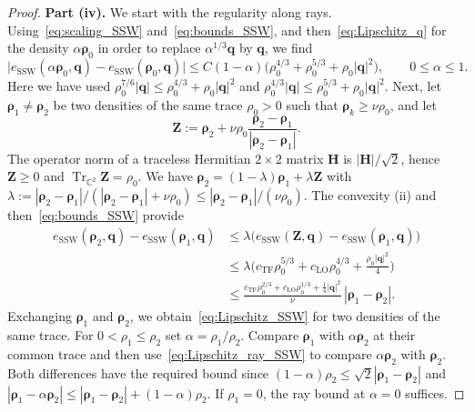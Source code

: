 \documentclass[final,reqno]{amsart}
\theoremstyle{remark}
\renewcommand{\le}{\leqslant}
\renewcommand{\ge}{\geqslant}
\DeclareMathOperator{\Tr}{Tr}
\newcommand{\Trs}{\Tr_{\CC^2}}
\newcommand{\CC}{\mathbb{C}}
\newcommand{\TF}{\mathrm{TF}}
\newcommand{\LO}{\mathrm{LO}}
\newcommand{\SSW}{\mathrm{SSW}}
\begin{document}
\begin{proof}
\medskip

\noindent\textbf{Part (iv).} We start with the regularity along rays. Using~\cref{eq:scaling_SSW} and~\cref{eq:bounds_SSW}, and then~\cref{eq:Lipschitz_q} for the density $\alpha\bm{\rho}_0$ in order to replace $\alpha^{1/3}\mathbf{q}$ by $\mathbf{q}$, we find
\begin{equation}\label{eq:Lipschitz_ray_SSW}
\big|e_\SSW(\alpha \bm{\rho}_0,\mathbf{q})-e_\SSW(\bm{\rho}_0,\mathbf{q})\big|\le C(1-\alpha)\Big(\rho_0^{4/3}+\rho_0^{5/3}+\rho_0|\mathbf{q}|^2\Big),\qquad 0\le\alpha\le1.
\end{equation}
Here we have used $\rho_0^{7/6}|\mathbf{q}|\le\rho_0^{4/3}+\rho_0|\mathbf{q}|^2$ and $\rho_0^{4/3}|\mathbf{q}|\le\rho_0^{5/3}+\rho_0|\mathbf{q}|^2$. Next, let $\bm{\rho}_1\neq\bm{\rho}_2$ be two densities of the same trace $\rho_0>0$ such that $\bm{\rho}_k\ge\nu\rho_0$, and let
$$
\mathbf{Z}:=\bm{\rho}_2+\nu\rho_0\frac{\bm{\rho}_2-\bm{\rho}_1}{|\bm{\rho}_2-\bm{\rho}_1|}.
$$
The operator norm of a traceless Hermitian $2\times2$ matrix $\mathbf{H}$ is $|\mathbf{H}|/\sqrt2$, hence $\mathbf{Z}\ge0$ and $\Trs\mathbf{Z}=\rho_0$. We have $\bm{\rho}_2=(1-\lambda)\bm{\rho}_1+\lambda\mathbf{Z}$ with $\lambda:=|\bm{\rho}_2-\bm{\rho}_1|/(|\bm{\rho}_2-\bm{\rho}_1|+\nu\rho_0)\le|\bm{\rho}_2-\bm{\rho}_1|/(\nu\rho_0)$. The convexity (ii) and then~\cref{eq:bounds_SSW} provide
\begin{align*}
e_\SSW(\bm{\rho}_2,\mathbf{q})-e_\SSW(\bm{\rho}_1,\mathbf{q})&\le\lambda\Big(e_\SSW(\mathbf{Z},\mathbf{q})-e_\SSW(\bm{\rho}_1,\mathbf{q})\Big)\\
&\le\lambda\Big(c_\TF\rho_0^{5/3}+c_\LO\rho_0^{4/3}+\frac{\rho_0|\mathbf{q}|^2}4\Big)\\
&\le\frac{c_\TF\rho_0^{2/3}+c_\LO\rho_0^{1/3}+\frac14|\mathbf{q}|^2}{\nu}\,|\bm{\rho}_1-\bm{\rho}_2|.
\end{align*}
Exchanging $\bm{\rho}_1$ and $\bm{\rho}_2$, we obtain~\cref{eq:Lipschitz_SSW} for two densities of the same trace. For $0<\rho_1\le\rho_2$ set $\alpha=\rho_1/\rho_2$. Compare $\bm{\rho}_1$ with $\alpha\bm{\rho}_2$ at their common trace and then use~\cref{eq:Lipschitz_ray_SSW} to compare $\alpha\bm{\rho}_2$ with $\bm{\rho}_2$. Both differences have the required bound since $(1-\alpha)\rho_2\le\sqrt2|\bm{\rho}_1-\bm{\rho}_2|$ and $|\bm{\rho}_1-\alpha\bm{\rho}_2|\le|\bm{\rho}_1-\bm{\rho}_2|+(1-\alpha)\rho_2$. If $\rho_1=0$, the ray bound at $\alpha=0$ suffices.

\medskip


\end{proof}
\end{document}
